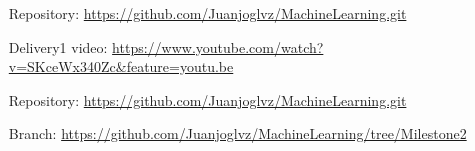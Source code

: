 \documentclass[idxtotoc,hyperref,openany]{labbook} %
\begin{document}
\begin{itemize}
\item[Repository:] \href{https://github.com/Juanjoglvz/MachineLearning.git}{https://github.com/Juanjoglvz/MachineLearning.git}
\item[Delivery1 video:] \href{https://www.youtube.com/watch?v=SKceWx340Zc\&feature=youtu.be}{https://www.youtube.com/watch?v=SKceWx340Zc\&feature=youtu.be}
\end{itemize}

\begin{itemize}
\item[Repository:] \href{https://github.com/Juanjoglvz/MachineLearning.git}{https://github.com/Juanjoglvz/MachineLearning.git}
\item[Branch:] \href{https://github.com/Juanjoglvz/MachineLearning/tree/Milestone2}{https://github.com/Juanjoglvz/MachineLearning/tree/Milestone2}
\end{itemize}
\end{document}
